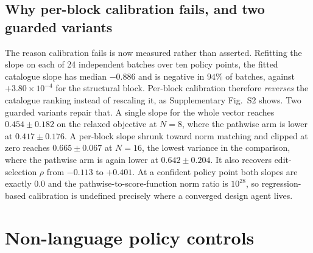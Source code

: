 \subsection{Why per-block calibration fails, and two guarded variants}
The reason calibration fails is now measured rather than asserted.  Refitting
the slope on each of 24 independent batches over ten policy points, the fitted
catalogue slope has median $-0.886$ and is negative in $94\%$ of batches,
against $+3.80\times10^{-4}$ for the structural block.  Per-block calibration
therefore \emph{reverses} the catalogue ranking instead of rescaling it, as
Supplementary Fig.~S2 shows.  Two guarded variants repair that.  A single slope for
the whole vector reaches $0.454\pm0.182$ on the relaxed objective at $N=8$,
where the pathwise arm is lower at $0.417\pm0.176$.  A per-block slope shrunk
toward norm matching and clipped at zero reaches $0.665\pm0.067$ at $N=16$, the
lowest variance in the comparison, where the pathwise arm is again lower at
$0.642\pm0.204$. It also recovers edit-selection $\rho$ from $-0.113$ to
$+0.401$.  At a confident policy point both slopes are exactly $0.0$ and the
pathwise-to-score-function norm ratio is $10^{28}$, so regression-based
calibration is undefined precisely where a converged design agent lives.

\section{Non-language policy controls}
\label{supp:policies}

